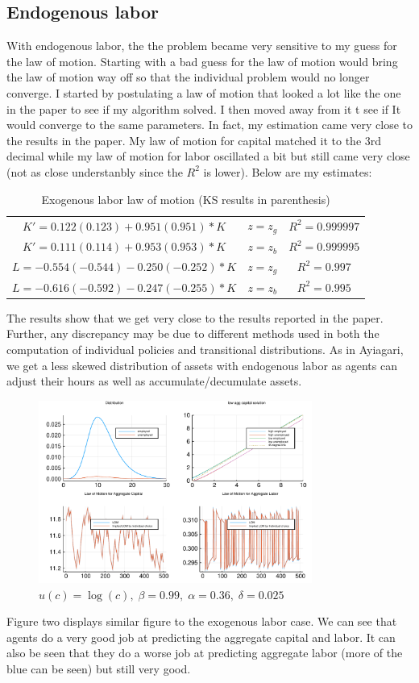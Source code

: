 \documentclass{article} %
\begin{document}
\subsection*{Endogenous labor}
With endogenous labor, the the problem became very sensitive to my guess for the law of motion. Starting with a bad guess for the law of motion would bring the law of motion way off so that the individual problem would no longer converge. I started by postulating a law of motion that looked a lot like the one in the paper to see if my algorithm solved. I then moved away from it t see if It would converge to the same parameters. In fact, my estimation came very close to the results in the paper. My law of motion for capital matched it to the 3rd decimal while my law of motion for labor oscillated a bit but still came very close (not as close understanbly since the $R^2$ is lower). Below are my estimates:
\begin{table}[h!]
  \centering
\begin{tabular}{c c c}
  $K' = 0.122 (0.123) + 0.951 (0.951)*K$ & $z = z_g$ & $R^2 = 0.999997$ \\
  $K' = 0.111 (0.114) + 0.953 (0.953)*K$ & $z = z_b$ & $R^2 = 0.999995$ \\
  $L = -0.554 (-0.544) - 0.250 (-0.252)*K$ & $z = z_g$ & $R^2 = 0.997$ \\
  $L = -0.616 (-0.592) - 0.247(-0.255)*K$ & $z = z_b$ & $R^2 = 0.995$ \\
\end{tabular}
\caption{Exogenous labor law of motion (KS results in parenthesis)}
\end{table}
The results show that we get very close to the results reported in the paper. Further, any discrepancy may be due to different methods used in both the computation of individual policies and transitional distributions. As in Ayiagari, we get a less skewed distribution of assets with endogenous labor as agents can adjust their hours as well as accumulate/decumulate assets. 
\begin{figure}[h!]
  \centering
  \includegraphics[width = 0.8\textwidth]{../KS_Elastic/endlaborks.pdf}
    \caption{$u(c)=\log(c),\; \beta = 0.99,\; \alpha=0.36,\; \delta =0.025$}
  \end{figure}
Figure two displays similar figure to the exogenous labor case. We can see that agents do a very good job at predicting the aggregate capital and labor. It can also be seen that they do a worse job at predicting aggregate labor (more of the blue can be seen) but still very good. 
\end{document}
